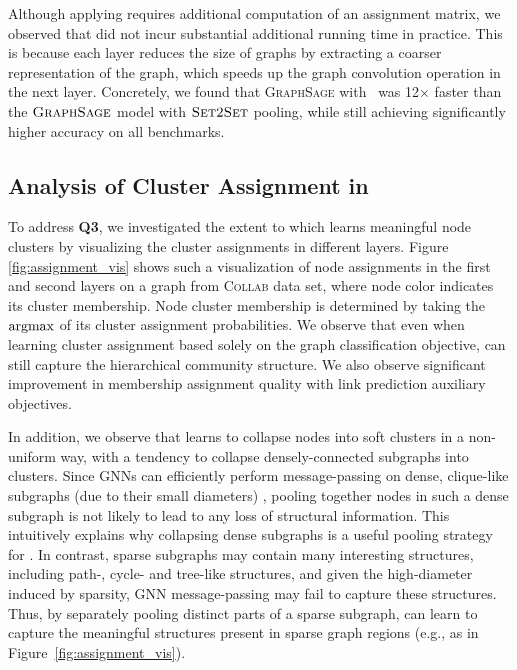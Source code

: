  Although applying \name requires additional computation of an assignment matrix, we observed that \name did not incur substantial additional running time in practice.
This is because each \name layer reduces the size of graphs by extracting a coarser representation of the graph, which speeds up the graph convolution operation in the next layer.
Concretely, we found that \textsc{GraphSage} with \name\ was 12$\times$ faster than the $\textsc{GraphSage}$ model with $\textsc{Set2Set}$ pooling, while still achieving significantly higher accuracy on all benchmarks. 

\subsection{Analysis of Cluster Assignment in \name}
\label{sec:assignment_vis}

To address {\bf Q3}, we investigated the extent to which \name learns meaningful node clusters by visualizing the cluster assignments in different layers. Figure \ref{fig:assignment_vis} shows such a visualization of node assignments in the first and second layers on a graph from \textsc{Collab} data set, where node color indicates its cluster membership. Node cluster membership is determined by taking the $\operatorname*{argmax}$ of its cluster assignment probabilities. We observe that even when learning cluster assignment based solely on the graph classification objective, \name can still capture the hierarchical community structure. We also observe significant improvement in membership assignment quality with link prediction auxiliary objectives.

In addition, we observe that \name learns to collapse nodes into soft clusters in a non-uniform way, with a tendency to collapse densely-connected subgraphs into clusters. 
Since GNNs can efficiently perform message-passing on dense, clique-like subgraphs (due to their small diameters) \cite{liao2018graph}, pooling together nodes in such a dense subgraph is not likely to lead to any loss of structural information. 
This intuitively explains why collapsing dense subgraphs is a useful pooling strategy for \name. 
In contrast, sparse subgraphs may contain many interesting structures, including path-, cycle- and tree-like structures, and given the high-diameter induced by sparsity, GNN message-passing may fail to capture these structures. 
Thus, by separately pooling distinct parts of a sparse subgraph, \name can learn to capture the meaningful structures present in sparse graph regions (e.g., as in Figure~\ref{fig:assignment_vis}). 

